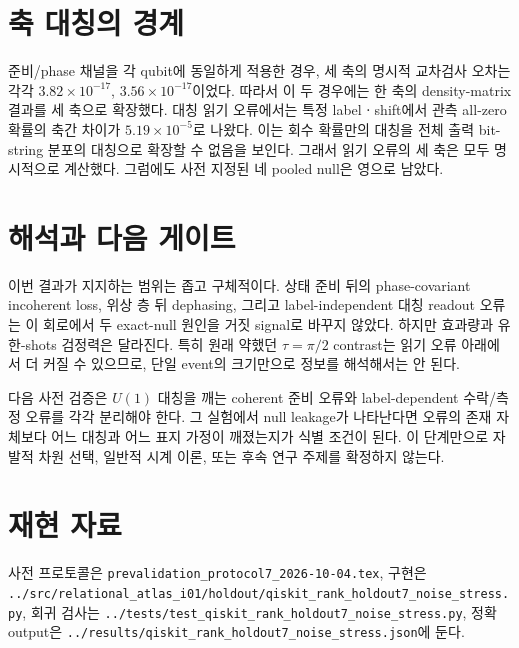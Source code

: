 \documentclass[11pt]{article}
\begin{document}
\section*{축 대칭의 경계}
준비/phase 채널을 각 qubit에 동일하게 적용한 경우, 세 축의 명시적 교차검사
오차는 각각 $3.82\times10^{-17}$, $3.56\times10^{-17}$이었다. 따라서 이 두
경우에는 한 축의 density-matrix 결과를 세 축으로 확장했다. 대칭 읽기 오류에서는
특정 labelㆍshift에서 관측 all-zero 확률의 축간 차이가 $5.19\times10^{-5}$로
나왔다. 이는 회수 확률만의 대칭을 전체 출력 bit-string 분포의 대칭으로
확장할 수 없음을 보인다. 그래서 읽기 오류의 세 축은 모두 명시적으로 계산했다.
그럼에도 사전 지정된 네 pooled null은 영으로 남았다.

\section*{해석과 다음 게이트}
이번 결과가 지지하는 범위는 좁고 구체적이다. 상태 준비 뒤의 phase-covariant
incoherent loss, 위상 층 뒤 dephasing, 그리고 label-independent 대칭 readout
오류는 이 회로에서 두 exact-null 원인을 거짓 signal로 바꾸지 않았다. 하지만
효과량과 유한-shots 검정력은 달라진다. 특히 원래 약했던 $\tau=\pi/2$ contrast는
읽기 오류 아래에서 더 커질 수 있으므로, 단일 event의 크기만으로 정보를
해석해서는 안 된다.

다음 사전 검증은 $U(1)$ 대칭을 깨는 coherent 준비 오류와 label-dependent
수락/측정 오류를 각각 분리해야 한다. 그 실험에서 null leakage가 나타난다면
오류의 존재 자체보다 어느 대칭과 어느 표지 가정이 깨졌는지가 식별 조건이 된다.
이 단계만으로 자발적 차원 선택, 일반적 시계 이론, 또는 후속 연구 주제를
확정하지 않는다.

\section*{재현 자료}
사전 프로토콜은 \texttt{prevalidation\_protocol7\_2026-10-04.tex}, 구현은
\texttt{../src/relational\_atlas\_i01/holdout/qiskit\_rank\_holdout7\_noise\_stress.py},
회귀 검사는 \texttt{../tests/test\_qiskit\_rank\_holdout7\_noise\_stress.py},
정확 output은 \texttt{../results/qiskit\_rank\_holdout7\_noise\_stress.json}에 둔다.
\end{document}
